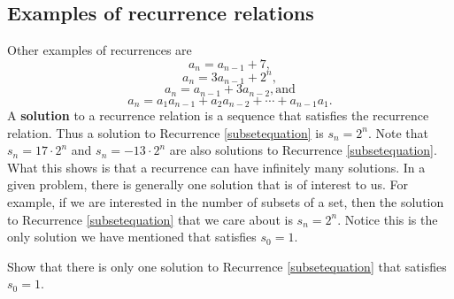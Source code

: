 \subsection{Examples of recurrence relations}
 Other examples of
recurrences are 
\begin{equation} a_n = a_{n-1} +
7,\label{arithmeticexample}\end{equation}
\begin{equation} a_n =3a_{n-1} + 2^n,\label{geometricdriven}\end{equation}
\begin{equation} a_n = a_{n-1} + 3a_{n-2},\mbox{
and}\label{secondorderlinear}\end{equation}
\begin{equation} a_n= a_1a_{n-1} + a_2a_{n-2}+\cdots +
a_{n-1}a_1.\label{Catalanrecurrence}\end{equation}  A {\bf
solution} to a recurrence relation is a
sequence that satisfies the recurrence relation.  Thus a solution to
Recurrence \ref{subsetequation} is $s_n =2^n$.  Note that
$s_n=17\cdot2^n$ and
$s_n=-13\cdot2^n$ are also solutions to Recurrence \ref{subsetequation}. 
What this shows is that a recurrence can have infinitely many solutions. 
In a given problem, there is generally one solution that is of interest
to us.  For example, if we are interested in the number of subsets of a
set, then the solution to Recurrence \ref{subsetequation} that we care
about is $s_n=2^n$.  Notice this is the only solution we have mentioned
that satisfies
$s_0=1$.
\bp 
\item Show that there is only one solution to Recurrence
\ref{subsetequation} that satisfies $s_0=1$. 

